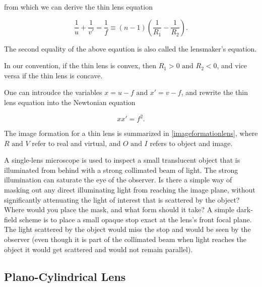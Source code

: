 \documentclass[english,a4paper,12pt]{report}
\begin{document}
from which we can derive the thin lens equation

\begin{equation}
    \frac{1}{u} + \frac{1}{v'} = \frac{1}{f} \equiv  (n-1) \left(\frac{1}{R_1 } - \frac{1}{R_2 }\right).
\end{equation}

The second equality of the above eqaution is also called the lensmaker's equation.

In our convention, if the thin lens is convex, then \(R_1 > 0 \text { and } R_2 < 0\), and vice versa if the thin lens is concave. 

One can introudce the variables \(x = u-f \text { and } x'= v-f\), and rewrite the thin lens equation into the Newtonian equation

\begin{equation}
    xx' = f^2.
\end{equation}

The image formation for a thin lens is summarized in \cref{imageformationlens}, where \(R \text { and }  V\) refer to real and virtual, and \(O \text { and } I\) refers to object and image.


{A single-lens microscope is used to inspect a small translucent object that is illuminated from behind with a strong collimated beam of light. The strong illumination can saturate the eye of the observer. Is there a simple way of masking out any direct illuminating light from reaching the image plane, without significantly attenuating the light of interest that is scattered by the object? Where would you place the mask, and what form should it take?}
{A simple dark-field scheme is to place a small opaque stop exact at the lens's front focal plane. The light scattered by the object would miss the stop and would be seen by the observer (even though it is part of the collimated beam when light reaches the object it would get scattered and would not remain parallel).} 








\subsection{Plano-Cylindrical Lens}
\end{document}
